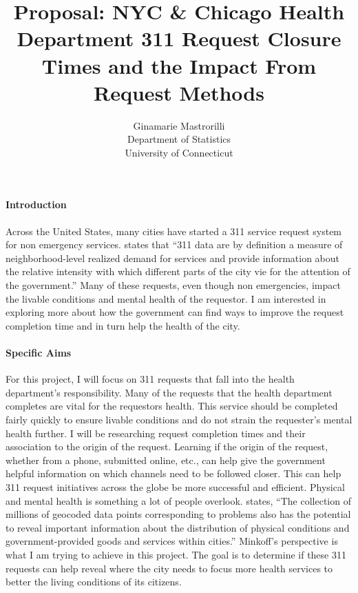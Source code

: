 \documentclass[12pt]{article}
\title{Proposal: NYC & Chicago Health Department 311 Request Closure Times and the Impact From Request Methods }
\author{Ginamarie Mastrorilli\\
  Department of Statistics\\
  University of Connecticut
}
\begin{document}
\maketitle


\paragraph{Introduction}
Across the United States, many cities have started a 311 service request system for non emergency services. 
\citet{white2018promises} states that “311 data are by definition a measure of neighborhood-level realized demand for services and provide information about the relative intensity with which different parts of the city vie for the attention of the government.” 
Many of these requests, even though non emergencies, impact the livable conditions and mental health of the requestor. 
I am interested in exploring more about how the government can find ways to improve the request completion time and in turn help the health of the city. 


\paragraph{Specific Aims}
For this project, I will focus on 311 requests that fall into the health department’s responsibility.
Many of the requests that the health department completes are vital for the requestors health. This service should be completed fairly quickly to ensure livable conditions and do not strain the requester's mental health further. 
I will be researching request completion times and their association to the origin of the request. 
Learning if the origin of the request, whether from a phone, submitted online, etc., can help give the government helpful information on which channels need to be followed closer. 
This can help 311 request initiatives across the globe be more successful and efficient. 
Physical and mental health is something a lot of people overlook. 
\citet{minkoff2016nyc} states, “The collection of millions of geocoded data points corresponding to problems also has the potential to reveal important information about the distribution of physical conditions and government-provided goods and services within cities.” 
Minkoff’s perspective is what I am trying to achieve in this project. 
The goal is to determine if these 311 requests can help reveal where the city needs to focus more health services to better the living conditions of its citizens. 
\end{document}
